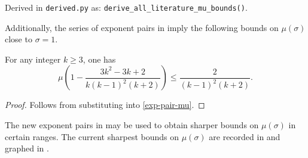 Derived in \texttt{derived.py} as: \texttt{derive\_all\_literature\_mu\_bounds()}.

Additionally, the series of exponent pairs in  imply the following bounds on $\mu(\sigma)$ close to $\sigma = 1$.
\begin{theorem}\label{hb_mu_bounds}
For any integer $k \ge 3$, one has
\[
\mu\left(1 - \frac{3 k^2 - 3 k + 2}{k(k - 1)^2(k + 2)}\right)\le \frac{2}{(k - 1)^2(k + 2)}.
\]
\end{theorem}
\begin{proof}
Follows from substituting  into \eqref{exp-pair-mu}.
\end{proof}


The new exponent pairs in  may be used to obtain sharper bounds on $\mu(\sigma)$ in certain ranges. The current sharpest bounds on $\mu(\sigma)$ are recorded in  and graphed in .


